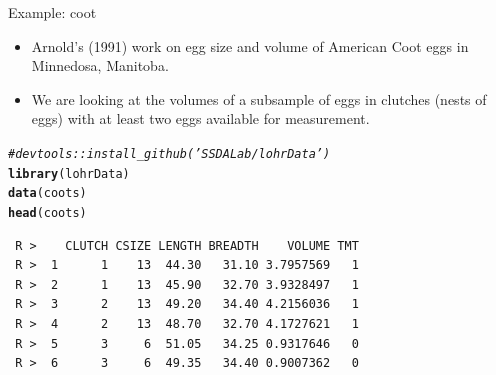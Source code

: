 \documentclass[10pt]{beamer}\usepackage[]{graphicx}\usepackage[]{xcolor}
\makeatletter
\newcommand{\hlcom}[1]{\textcolor[rgb]{0.678,0.584,0.686}{\textit{#1}}}%
\newcommand{\hlstd}[1]{\textcolor[rgb]{0.345,0.345,0.345}{#1}}%
\newcommand{\hlkwd}[1]{\textcolor[rgb]{0.737,0.353,0.396}{\textbf{#1}}}%
\newenvironment{kframe}{%
 \def\at@end@of@kframe{}%
 \ifinner\ifhmode%
  \def\at@end@of@kframe{\end{minipage}}%
  \begin{minipage}{\columnwidth}%
 \fi\fi%
 \def\FrameCommand##1{\hskip\@totalleftmargin \hskip-\fboxsep
 \colorbox{shadecolor}{##1}\hskip-\fboxsep
     \hskip-\linewidth \hskip-\@totalleftmargin \hskip\columnwidth}%
 \MakeFramed {\advance\hsize-\width
   \@totalleftmargin\z@ \linewidth\hsize
   \@setminipage}}%
 {\par\unskip\endMakeFramed%
 \at@end@of@kframe}
\newenvironment{knitrout}{}{} %
\makeatother
\begin{document}
\begin{frame}[containsverbatim]{Example: coot}
\begin{itemize}
\item Arnold's (1991) work on egg size and volume of American Coot eggs in Minnedosa, Manitoba.
\item We are looking at the volumes of a subsample of eggs in clutches (nests of eggs) with at least two eggs available for measurement.
\end{itemize}
\small
\begin{knitrout}
\color{fgcolor}\begin{kframe}
\begin{alltt}
\hlcom{# devtools::install_github('SSDALab/lohrData')}
\hlkwd{library}\hlstd{(lohrData)}
\hlkwd{data}\hlstd{(coots)}
\hlkwd{head}\hlstd{(coots)}
\end{alltt}
\begin{verbatim}
 R >    CLUTCH CSIZE LENGTH BREADTH    VOLUME TMT
 R >  1      1    13  44.30   31.10 3.7957569   1
 R >  2      1    13  45.90   32.70 3.9328497   1
 R >  3      2    13  49.20   34.40 4.2156036   1
 R >  4      2    13  48.70   32.70 4.1727621   1
 R >  5      3     6  51.05   34.25 0.9317646   0
 R >  6      3     6  49.35   34.40 0.9007362   0
\end{verbatim}
\end{kframe}
\end{knitrout}
\end{frame}
\end{document}
